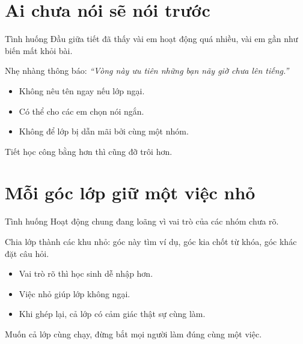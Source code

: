 \section{Ai chưa nói sẽ nói trước}
\begin{tinhhuong}{Tình huống}
Đầu giữa tiết đã thấy vài em hoạt động quá nhiều, vài em gần như biến mất khỏi bài.
\end{tinhhuong}
\begin{goiydungngay}
Nhẹ nhàng thông báo: \textit{``Vòng này ưu tiên những bạn nãy giờ chưa lên tiếng.''}
\begin{itemize}
\item Không nêu tên ngay nếu lớp ngại.
\item Có thể cho các em chọn nói ngắn.
\item Không để lớp bị dẫn mãi bởi cùng một nhóm.
\end{itemize}
\end{goiydungngay}
\begin{cauchot}
Tiết học công bằng hơn thì cũng đỡ trôi hơn.
\end{cauchot}
\ngancach

\section{Mỗi góc lớp giữ một việc nhỏ}
\begin{tinhhuong}{Tình huống}
Hoạt động chung đang loãng vì vai trò của các nhóm chưa rõ.
\end{tinhhuong}
\begin{goiydungngay}
Chia lớp thành các khu nhỏ: góc này tìm ví dụ, góc kia chốt từ khóa, góc khác đặt câu hỏi.
\begin{itemize}
\item Vai trò rõ thì học sinh dễ nhập hơn.
\item Việc nhỏ giúp lớp không ngại.
\item Khi ghép lại, cả lớp có cảm giác thật sự cùng làm.
\end{itemize}
\end{goiydungngay}
\begin{cauchot}
Muốn cả lớp cùng chạy, đừng bắt mọi người làm đúng cùng một việc.
\end{cauchot}
\ngancach


